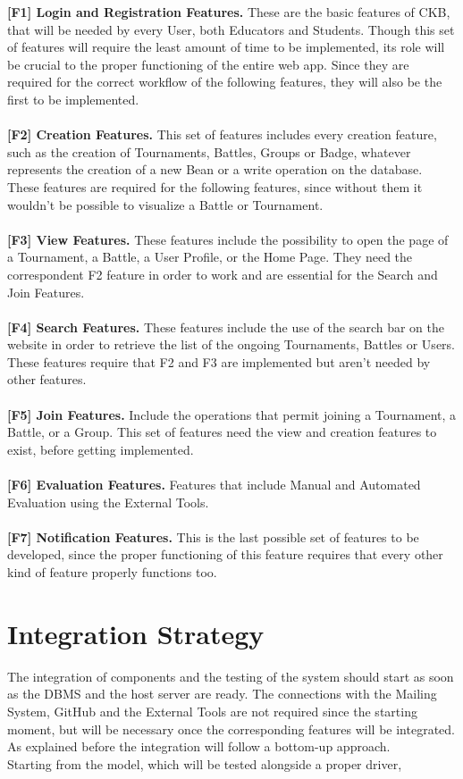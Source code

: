 \textbf{[F1] Login and Registration Features.} These are the basic features of CKB, that will be needed by every User, both Educators and Students. Though this set of features will require the least amount of time to be implemented, its role will be crucial to the proper functioning of the entire web app. Since they are required for the correct workflow of the following features, they will also be the first to be implemented.
\\ \\
\textbf{[F2] Creation Features.} This set of features includes every creation feature, such as the creation of Tournaments, Battles, Groups or Badge, whatever represents the creation of a new Bean or a write operation on the database. These features are required for the following features, since without them it wouldn’t be possible to visualize a Battle or Tournament.
\\ \\
\textbf{[F3] View Features.} These features include the possibility to open the page of a Tournament, a Battle, a User Profile, or the Home Page. They need the correspondent F2 feature in order to work and are essential for the Search and Join Features.
\\ \\
\textbf{[F4] Search Features.} These features include the use of the search bar on the website in order to retrieve the list of the ongoing Tournaments, Battles or Users. These features require that F2 and F3 are implemented but aren’t needed by other features.
\\ \\
\textbf{[F5] Join Features.} Include the operations that permit joining a Tournament, a Battle, or a Group. This set of features need the view and creation features to exist, before getting implemented.
\\ \\
\textbf{[F6] Evaluation Features.} Features that include Manual and Automated Evaluation using the External Tools. 
\\ \\
\textbf{[F7] Notification Features.} This is the last possible set of features to be developed, since the proper functioning of this feature requires that every other kind of feature properly functions too.  

\newpage
\section{Integration Strategy}
The integration of components and the testing of the system should start as soon as the DBMS and the host server are ready. The connections with the Mailing System, GitHub and the External Tools are not required since the starting moment, but will be necessary once the corresponding features will be integrated. As explained before the integration will follow a bottom-up approach.
\\
Starting from the model, which will be tested alongside a proper driver, 


